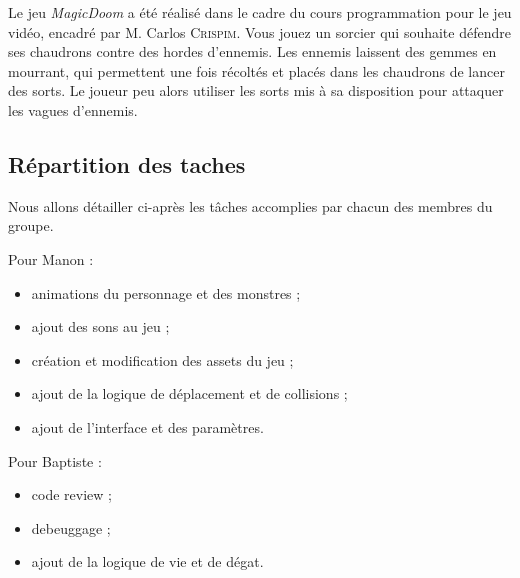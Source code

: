 Le jeu \textit{MagicDoom} a été réalisé dans le cadre du cours programmation pour le jeu vidéo, encadré par M. Carlos \textsc{Crispim}. Vous jouez un sorcier qui souhaite défendre ses chaudrons contre des hordes d'ennemis. Les ennemis laissent des gemmes en mourrant, qui permettent une fois récoltés et placés dans les chaudrons de lancer des sorts. Le joueur peu alors utiliser les sorts mis à sa disposition pour attaquer les vagues d'ennemis.

\subsection{Répartition des taches}

Nous allons détailler ci-après les tâches accomplies par chacun des membres du groupe.

Pour Manon :
\begin{itemize}
    \item animations du personnage et des monstres ;
    \item ajout des sons au jeu ;
    \item création et modification des assets du jeu ;
    \item ajout de la logique de déplacement et de collisions ;
    \item ajout de l'interface et des paramètres.

\end{itemize}

Pour Baptiste :
\begin{itemize}
    \item code review ;
    \item debeuggage ;
    \item ajout de la logique de vie et de dégat.
\end{itemize}
